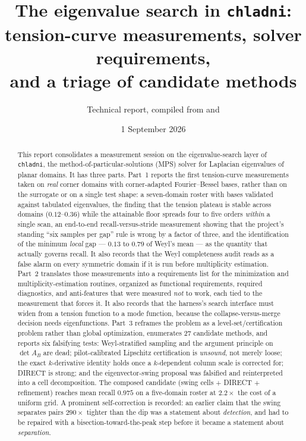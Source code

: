\documentclass[11pt]{article}
\title{The eigenvalue search in \texttt{chladni}:\\
tension-curve measurements, solver requirements,\\
and a triage of candidate methods}
\author{Technical report, compiled from \file{notes/} and \file{docs/design/}}
\date{1 September 2026}
\newcommand{\file}[1]{\texttt{#1}}
\begin{document}
\maketitle

\begin{abstract}
\noindent
This report consolidates a measurement session on the eigenvalue-search layer of
\file{chladni}, the method-of-particular-solutions (MPS) solver for Laplacian eigenvalues of
planar domains. It has three parts. Part~1 reports the first tension-curve measurements taken
on \emph{real} corner domains with corner-adapted Fourier--Bessel bases, rather than on the
surrogate or on a single test shape: a seven-domain roster with bases validated against
tabulated eigenvalues, the finding that the tension plateau is stable across domains
($0.12$--$0.36$) while the attainable floor spreads four to five orders \emph{within} a single
scan, an end-to-end recall-versus-stride measurement showing that the project's standing
``six samples per gap'' rule is wrong by a factor of three, and the identification of the
minimum \emph{local} gap --- $0.13$ to $0.79$ of Weyl's mean --- as the quantity that actually
governs recall. It also records that the Weyl completeness audit reads as a false alarm on
every symmetric domain if it is run before multiplicity estimation.
Part~2 translates those measurements into a requirements list for the minimization and
multiplicity-estimation routines, organized as functional requirements, required diagnostics,
and anti-features that were measured \emph{not} to work, each tied to the measurement that
forces it. It also records that the harness's search interface must widen from a tension
function to a mode function, because the collapse-versus-merge decision needs eigenfunctions.
Part~3 reframes the problem as a level-set/certification problem rather than global
optimization, enumerates 27 candidate methods, and reports six falsifying tests: Weyl-stratified
sampling and the argument principle on $\det A_B$ are dead; pilot-calibrated Lipschitz
certification is \emph{unsound}, not merely loose; the exact $k$-derivative identity holds once
a $k$-dependent column scale is corrected for; DIRECT is strong; and the eigenvector-swing
proposal was falsified and reinterpreted into a cell decomposition. The composed candidate
(swing cells $+$ DIRECT $+$ refinement) reaches mean recall $0.975$ on a five-domain roster at
$2.2\times$ the cost of a uniform grid. A prominent self-correction is recorded: an earlier
claim that the swing separates pairs $290\times$ tighter than the dip was a statement about
\emph{detection}, and had to be repaired with a bisection-toward-the-peak step before it
became a statement about \emph{separation}.
\end{abstract}
\end{document}
